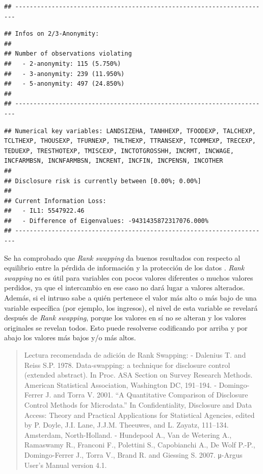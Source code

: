\documentclass[]{book}
\theoremstyle{definition}
\theoremstyle{definition}
\theoremstyle{definition}
\theoremstyle{definition}
\theoremstyle{remark}
\begin{document}
\begin{verbatim}
## ----------------------------------------------------------------------
\end{verbatim}

\begin{verbatim}
## Infos on 2/3-Anonymity:
## 
## Number of observations violating
##   - 2-anonymity: 115 (5.750%)
##   - 3-anonymity: 239 (11.950%)
##   - 5-anonymity: 497 (24.850%)
## 
## ----------------------------------------------------------------------
\end{verbatim}

\begin{verbatim}
## Numerical key variables: LANDSIZEHA, TANHHEXP, TFOODEXP, TALCHEXP, TCLTHEXP, THOUSEXP, TFURNEXP, THLTHEXP, TTRANSEXP, TCOMMEXP, TRECEXP, TEDUEXP, TRESTHOTEXP, TMISCEXP, INCTOTGROSSHH, INCRMT, INCWAGE, INCFARMBSN, INCNFARMBSN, INCRENT, INCFIN, INCPENSN, INCOTHER
## 
## Disclosure risk is currently between [0.00%; 0.00%]
## 
## Current Information Loss:
##   - IL1: 5547922.46
##   - Difference of Eigenvalues: -9431435872317076.000%
## ----------------------------------------------------------------------
\end{verbatim}

Se ha comprobado que \emph{Rank swapping} da buenos resultados con respecto al equilibrio entre la pérdida de información y la protección de los datos \citep{DoTo01a}. \emph{Rank swapping} no es útil para variables con pocos valores diferentes o muchos valores perdidos, ya que el intercambio en ese caso no dará lugar a valores alterados. Además, si el intruso sabe a quién pertenece el valor más alto o más bajo de una variable específica (por ejemplo, los ingresos), el nivel de esta variable se revelará después de \emph{Rank swapping}, porque los valores en sí no se alteran y los valores originales se revelan todos. Esto puede resolverse codificando por arriba y por abajo los valores más bajos y/o más altos.

\begin{quote}
Lectura recomendada de adición de Rank Swapping:
- Dalenius T. and Reiss S.P. 1978. Data-swapping: a technique for disclosure control (extended abstract). In Proc. ASA Section on Survey Research Methods. American Statistical Association, Washington DC, 191--194.
- Domingo-Ferrer J. and Torra V. 2001. ``A Quantitative Comparison of Disclosure Control Methods for Microdata.'' In Confidentiality, Disclosure and Data Access: Theory and Practical Applications for Statistical Agencies, edited by P. Doyle, J.I. Lane, J.J.M. Theeuwes, and L. Zayatz, 111--134. Amsterdam, North-Holland.
- Hundepool A., Van de Wetering A., Ramaswamy R., Franconi F., Polettini S., Capobianchi A., De Wolf P.-P., Domingo-Ferrer J., Torra V., Brand R. and Giessing S. 2007. μ-Argus User's Manual version 4.1.
\end{quote}
\end{document}
